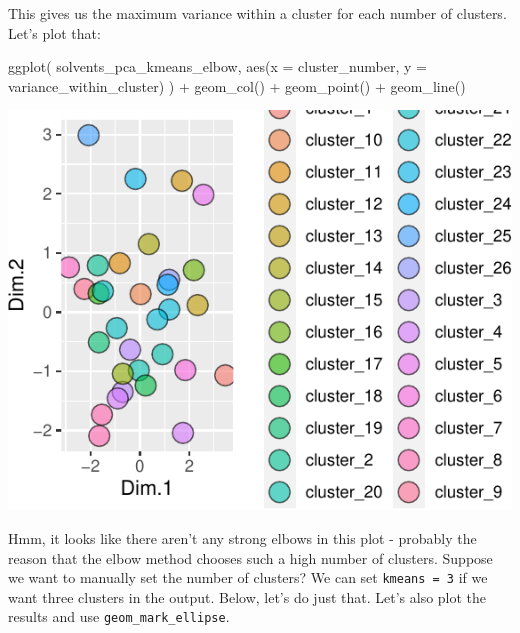 \documentclass[
]{krantz}
\newenvironment{Shaded}{\begin{snugshade}}{\end{snugshade}}
\newcommand{\AttributeTok}[1]{\textcolor[rgb]{0.77,0.63,0.00}{#1}}
\newcommand{\FunctionTok}[1]{\textcolor[rgb]{0.00,0.00,0.00}{#1}}
\newcommand{\NormalTok}[1]{#1}
\newcommand{\SpecialCharTok}[1]{\textcolor[rgb]{0.00,0.00,0.00}{#1}}
\begin{document}
This gives us the maximum variance within a cluster for each number of clusters. Let's plot that:

\begin{Shaded}
\begin{Highlighting}[]
\FunctionTok{ggplot}\NormalTok{(}
\NormalTok{  solvents\_pca\_kmeans\_elbow,}
  \FunctionTok{aes}\NormalTok{(}\AttributeTok{x =}\NormalTok{ cluster\_number, }\AttributeTok{y =}\NormalTok{ variance\_within\_cluster)}
\NormalTok{) }\SpecialCharTok{+}
  \FunctionTok{geom\_col}\NormalTok{() }\SpecialCharTok{+}
  \FunctionTok{geom\_point}\NormalTok{() }\SpecialCharTok{+}
  \FunctionTok{geom\_line}\NormalTok{()}
\end{Highlighting}
\end{Shaded}

\begin{center}\includegraphics[width=0.8\linewidth]{index_files/figure-latex/unnamed-chunk-107-1} \end{center}

Hmm, it looks like there aren't any strong elbows in this plot - probably the reason that the elbow method chooses such a high number of clusters. Suppose we want to manually set the number of clusters? We can set \texttt{kmeans\ =\ 3} if we want three clusters in the output. Below, let's do just that. Let's also plot the results and use \texttt{geom\_mark\_ellipse}.
\end{document}
